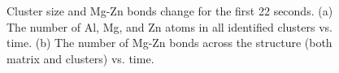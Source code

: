 \begingroup
\begin{figure}[!ht]
  \centering
\caption[Cluster size and Mg-Zn bonds change for the first 22 seconds.]{Cluster size and Mg-Zn bonds change for the first 22 seconds. (a) The number of Al, Mg, and Zn atoms in all identified clusters vs. time. (b) The number of Mg-Zn bonds across the structure (both matrix and clusters) vs. time.}
\label{Chap:Al/Vac:fig:long}
\end{figure}
\endgroup


